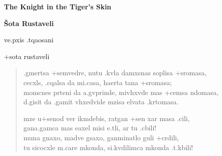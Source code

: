 \documentclass[12pt]{article}
\begin{document}
\begin{center}
{\LARGE\bf The Knight in the Tiger's Skin

\medskip
{\large\bf \v Sota Rustaveli}

\bigskip\bigskip
\Huge\mxedc ve.pxis .tqaosani
}

\medskip
{\large\mxedb +sota rustaveli}
\end{center}

\bigskip

\begin{verse}

\begin{mxedr}
.gmertsa +semvedre, nutu .kvla damxsnas soplisa +sromasa,\\
cecxls, .cqalsa da mi.casa, haerta tana +sromasa;\\
momcnes prteni da a.gvprinde, mivhxvde mas +cemsa ndomasa,\\
d.gisit da .gamit vhxedvide mzisa elvata .krtomasa.

\medskip
mze u+senod ver ikmdebis, ratgan +sen xar masa .cili,\\
gana.gamca mas eaxel misi e.tli, ar tu .cbili!\\
muna gnaxo, madve gsaxo, ganminatlo guli +crdili,\\
tu sicocxle m.care mkonda, si.kvdilimca mkonda .t.kbili!
\end{mxedr}
\end{verse}
\end{document}
